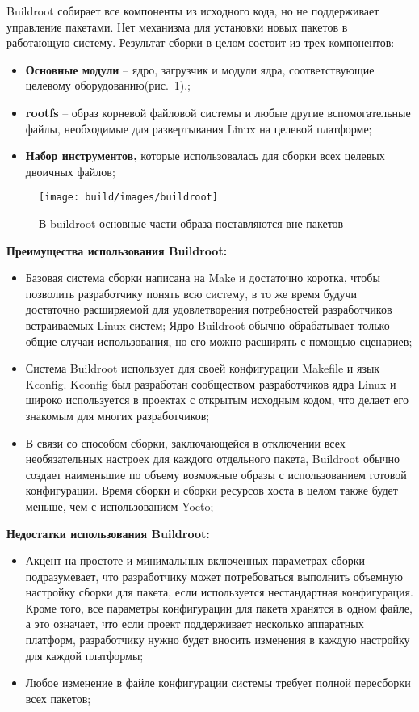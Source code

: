 Buildroot собирает все компоненты из исходного кода, но не поддерживает управление пакетами. Нет механизма для установки новых пакетов в работающую систему.
Результат сборки в целом состоит из трех компонентов:
\begin{itemize}
  \item \textbf{Основные модули} -- ядро, загрузчик и модули ядра, соответствующие целевому оборудованию(рис.~\ref{fig:buildroot}).;
  \item \textbf{rootfs} -- образ корневой файловой системы и любые другие вспомогательные файлы, необходимые для развертывания Linux на целевой платформе;
  \item \textbf{Набор инструментов,} которые использовалась для сборки всех целевых двоичных файлов;
\end{itemize}

\begin{figure}[h!]
  \centering
  \setlength{\fboxsep}{5pt}
  \texttt{[image: build/images/buildroot]}
  \caption{В buildroot основные части образа поставляются вне пакетов}\label{fig:buildroot}
\end{figure}

\textbf{Преимущества использования Buildroot:}
\begin{itemize}
  \item Базовая система сборки написана на Make\cite{BUILDROOT} и достаточно коротка, чтобы позволить разработчику понять всю систему, в то же время будучи достаточно расширяемой для удовлетворения потребностей разработчиков встраиваемых Linux-систем;
Ядро Buildroot обычно обрабатывает только общие случаи использования, но его можно расширять с помощью сценариев;
  \item Система Buildroot использует для своей конфигурации Makefile и язык Kconfig\cite{BUILDROOT}. Kconfig был разработан сообществом разработчиков ядра Linux\cite{KCONFIG} и широко используется в проектах с открытым исходным кодом, что делает его знакомым для многих разработчиков;
  \item В связи со способом сборки, заключающейся в отключении всех необязательных настроек для каждого отдельного пакета, Buildroot обычно создает наименьшие по объему возможные образы с использованием готовой конфигурации. 
Время сборки и сборки ресурсов хоста в целом также будет меньше, чем с использованием Yocto;
\end{itemize}

\textbf{Недостатки использования Buildroot:}
\begin{itemize}
  \item Акцент на простоте и минимальных включенных параметрах сборки подразумевает, что разработчику может потребоваться выполнить объемную настройку сборки для пакета, если используется нестандартная конфигурация. Кроме того, все параметры конфигурации для пакета хранятся в одном файле\cite{BUILDROOT}, а это означает, что если проект поддерживает несколько аппаратных платформ, разработчику нужно будет вносить изменения в каждую настройку для каждой платформы;
  \item Любое изменение в файле конфигурации системы требует полной пересборки всех пакетов;
\end{itemize}


